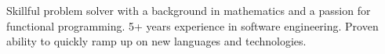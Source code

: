 

\begin{cvparagraph}

Skillful problem solver with a background in mathematics and a passion for
  functional programming.  5+ years experience in
  software engineering.  Proven ability to quickly ramp up on new
  languages and technologies.
\end{cvparagraph}
